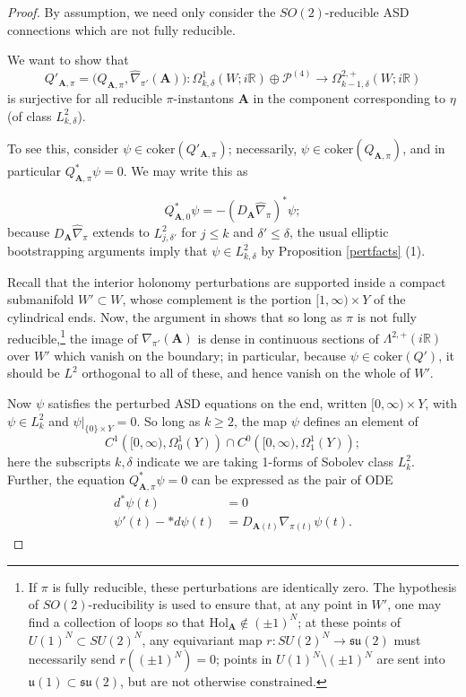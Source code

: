\documentclass[10pt,a4paper]{amsart}
\theoremstyle{definition}
\theoremstyle{remark}
\numberwithin{figure}{qchap}
\begin{document}
\begin{proof}By assumption, we need only consider the $SO(2)$-reducible ASD connections which are not fully reducible.

We want to show that
$$Q'_{\mathbf{A},\pi} = \big(Q_{\mathbf{A},\pi}, \widehat{\nabla}_{\pi'}(\mathbf{A})\big): \Omega^1_{k,\delta}(W;i\mathbb R) \oplus \mathcal P^{(4)} \to \Omega^{2,+}_{k-1,\delta}(W;i\mathbb R)$$ is surjective for all reducible $\pi$-instantons $\mathbf{A}$ in the component corresponding to $\eta$ (of class $L^2_{k,\delta}$).

To see this, consider $\psi \in \text{coker}(Q'_{\mathbf{A},\pi})$; necessarily, $\psi \in \text{coker}(Q_{\mathbf{A},\pi})$, and in particular $Q^*_{\mathbf{A},\pi}\psi = 0$. We may write this as

$$Q^*_{\mathbf{A},0}\psi = -(D_{\mathbf{A}}\widehat{\nabla}_\pi)^*\psi;$$ because $D_{\mathbf{A}}\widehat{\nabla}_\pi$ extends to $L^2_{j,\delta'}$ for $j \le k$ and $\delta' \le \delta$, the usual elliptic bootstrapping arguments imply that $\psi \in L^2_{k,\delta}$ by Proposition \ref{pertfacts} (1).

Recall that the interior holonomy perturbations are supported inside a compact submanifold $W' \subset W$, whose complement is the portion $[1,\infty) \times Y$ of the cylindrical ends. Now, the argument in \cite[Lemma~3.7]{Kronheimer} shows that so long as $\pi$ is not fully reducible,\footnote{If $\pi$ is fully reducible, these perturbations are identically zero. The hypothesis of $SO(2)$-reducibility is used to ensure that, at any point in $W'$, one may find a collection of loops so that $\text{Hol}_{\mathbf{A}} \not \in (\pm 1)^N$; at these points of $U(1)^N \subset SU(2)^N$, any equivariant map $r: SU(2)^N \to \mathfrak{su}(2)$ must necessarily send $r((\pm 1)^N) = 0$; points in $U(1)^N \setminus (\pm 1)^N$ are sent into $\mathfrak u(1) \subset \mathfrak{su}(2)$, but are not otherwise constrained.} the image of $\widehat{\nabla}_{\pi'}(\mathbf{A})$ is dense in continuous sections of $\Lambda^{2,+}(i\mathbb R)$ over $W'$ which vanish on the boundary; in particular, because $\psi \in \text{coker}(Q')$, it should be $L^2$ orthogonal to all of these, and hence vanish on the whole of $W'$.

Now $\psi$ satisfies the perturbed ASD equations on the end, written $[0, \infty) \times Y$, with $\psi \in L^2_k$ and $\psi\big|_{\{0\} \times Y} = 0$. So long as $k \geq 2$, the map $\psi$ defines an element of
$$C^1\left([0, \infty), \Omega^1_0(Y)\right) \cap C^0\left([0, \infty), \Omega^1_1(Y)\right);$$
here the subscripts $k,\delta$ indicate we are taking 1-forms of Sobolev class $L^2_{k}$. Further, the equation $Q_{\mathbf A, \pi}^* \psi = 0$ can be expressed as the pair of ODE
\begin{align*}
d^*\psi(t) &= 0 \\
\psi'(t) - *d\psi(t) &= D_{\mathbf{A}(t)} \nabla_{\pi(t)} \psi(t).
\end{align*}


\end{proof}
\end{document}
